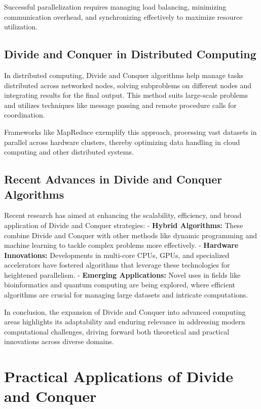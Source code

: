 \documentclass[12pt]{book} %
\begin{document}
Successful parallelization requires managing load balancing, minimizing communication overhead, and synchronizing effectively to maximize resource utilization.

\subsection{Divide and Conquer in Distributed Computing}

In distributed computing, Divide and Conquer algorithms help manage tasks distributed across networked nodes, solving subproblems on different nodes and integrating results for the final output. This method suits large-scale problems and utilizes techniques like message passing and remote procedure calls for coordination.

Frameworks like MapReduce exemplify this approach, processing vast datasets in parallel across hardware clusters, thereby optimizing data handling in cloud computing and other distributed systems.

\subsection{Recent Advances in Divide and Conquer Algorithms}

Recent research has aimed at enhancing the scalability, efficiency, and broad application of Divide and Conquer strategies:
- \textbf{Hybrid Algorithms:} These combine Divide and Conquer with other methods like dynamic programming and machine learning to tackle complex problems more effectively.
- \textbf{Hardware Innovations:} Developments in multi-core CPUs, GPUs, and specialized accelerators have fostered algorithms that leverage these technologies for heightened parallelism.
- \textbf{Emerging Applications:} Novel uses in fields like bioinformatics and quantum computing are being explored, where efficient algorithms are crucial for managing large datasets and intricate computations.

In conclusion, the expansion of Divide and Conquer into advanced computing areas highlights its adaptability and enduring relevance in addressing modern computational challenges, driving forward both theoretical and practical innovations across diverse domains.


\section{Practical Applications of Divide and Conquer}
\end{document}
